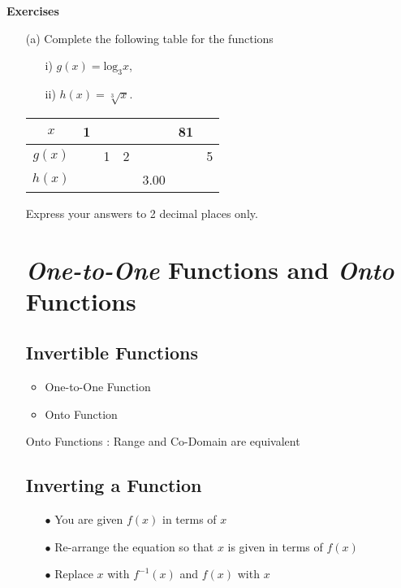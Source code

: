 \documentclass[12pt]{article}
\begin{document}
\textbf{Exercises}
\begin{itemize}
\item[(a)] 
Complete the following table for the functions 
\begin{itemize}
\item[i)] $g(x) = \mbox{log}_3x$,
\item[ii)] $h(x) =\sqrt[3]{x}$.
\end{itemize} 
\begin{center}

\begin{tabular}{|c||c|c|c|c|c|c|}
\hline $x$ &  \phantom{p}1\phantom{p}&  &  &  & 81 &  \\ 
\hline \phantom{p} $g(x)$ \phantom{p}&  & \phantom{p}1\phantom{p} & \phantom{p}2\phantom{p} &  &  &  \phantom{p}5\phantom{p} \\ 
\hline \phantom{p}$h(x)$ \phantom{p}&  &  &  &  3.00 & \phantom{p}\phantom{p}\phantom{p}  &  \\ 
\hline 
\end{tabular} 
\end{center}

Express your answers to 2 decimal places only.

\newpage
\section{\textit{One-to-One} Functions and \textit{Onto} Functions}

\subsection{Invertible Functions}
\begin{itemize}
 \item One-to-One Function
 \item Onto Function
\end{itemize}

Onto Functions : Range and Co-Domain are equivalent

\subsection{Inverting a Function}

\begin{itemize}
\item[$\bullet$] You are given $f(x)$ in terms of $x$
\item[$\bullet$] Re-arrange the equation so that $x$ is given in terms of $f(x)$
\item[$\bullet$] Replace $x$ with $f^{-1}(x)$ and $f(x)$ with $x$
\end{itemize}


\end{itemize}
\end{document}
